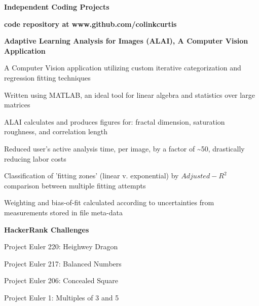 \documentclass[letterpaper,final]{memoir}
\newcommand{\Sep}{\vspace{1.0em}}
\newcommand{\SmallSep}{\vspace{0.4em}}
\newcommand{\CVSection}[1]
	{\LARGE\textbf{#1}\par
	\SmallSep\normalsize}
\newcommand{\CVItem}[1]
	{\textbf{\color{Blue} #1}}
\begin{document}

\notoserif \CVSection{Independent Coding Projects}

\normalfont

\SmallSep

\CVItem{code repository at www.github.com/colinkcurtis} 

\Sep

\CVItem{Adaptive Learning Analysis for Images (ALAI), A Computer Vision Application} 

\begin{compactitem}[\color{Blue}$\circ$]
   
    \Sep

    \item A Computer Vision application utilizing custom iterative categorization and regression fitting techniques
    \SmallSep
    \item Written using MATLAB, an ideal tool for linear algebra and statistics over large matrices
    \SmallSep
    \item ALAI calculates and produces figures for: fractal dimension, saturation roughness, and correlation length
    \SmallSep
    \item Reduced user's active analysis time, per image, by a factor of \textasciitilde 50, drastically reducing labor costs
    \SmallSep
    \item Classification of 'fitting zones' (linear v. exponential) by $Adjusted-R^2$ comparison between multiple fitting attempts
    \SmallSep
    \item Weighting and bias-of-fit calculated according to uncertainties from measurements stored in file meta-data
    
    \Sep

\end{compactitem}

\CVItem{HackerRank Challenges}
\SmallSep

\begin{multicols}{2}

    \begin{compactitem}[\color{Blue}$\circ$]

        
        \item Project Euler 220:    Heighwey Dragon
        \SmallSep
        \item Project Euler 217:    Balanced Numbers
        \SmallSep
        \item Project Euler 206:    Concealed Square
        \SmallSep
        \item Project Euler 1:      Multiples of 3 and 5

       
    \end{compactitem}

\end{multicols}
\end{document}
